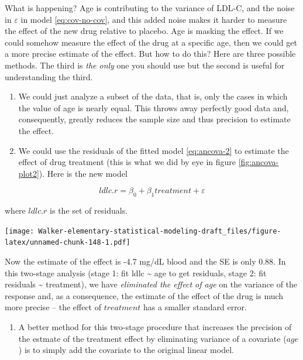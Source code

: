 \documentclass[]{book}
\providecommand{\tightlist}{%
  \setlength{\itemsep}{0pt}\setlength{\parskip}{0pt}}
\begin{document}
What is happening? Age is contributing to the variance of LDL-C, and the noise in \(\varepsilon\) in model \eqref{eq:cov-no-cov}, and this added noise makes it harder to measure the effect of the new drug relative to placebo. Age is masking the effect. If we could somehow measure the effect of the drug at a specific age, then we could get a more precise estimate of the effect. But how to do this? Here are three possible methods. The third is \emph{the only} one you should use but the second is useful for understanding the third.

\begin{enumerate}
\def\labelenumi{\arabic{enumi}.}
\item
  We could just analyze a subset of the data, that is, only the cases in which the value of age is nearly equal. This throws away perfectly good data and, consequently, greatly reduces the sample size and thus precision to estimate the effect.
\item
  We could use the residuals of the fitted model \eqref{eq:ancova-2} to estimate the effect of drug treatment (this is what we did by eye in figure \ref{fig:ancova-plot2}). Here is the new model
\end{enumerate}

\begin{equation}
ldlc.r = \beta_0 + \beta_1 treatment + \varepsilon
\label{eq:ancova-3}
\end{equation}

where \(ldlc.r\) is the set of residuals.

\texttt{[image: Walker-elementary-statistical-modeling-draft\_files/figure-latex/unnamed-chunk-148-1.pdf]}

Now the estimate of the effect is -4.7 mg/dL blood and the SE is only 0.88. In this two-stage analysis (stage 1: fit ldlc \textasciitilde{} age to get residuals, stage 2: fit residuals \textasciitilde{} treatment), we have \emph{eliminated the effect of age} on the variance of the response and, as a consequence, the estimate of the effect of the drug is much more precise -- the effect of \(treatment\) has a smaller standard error.

\begin{enumerate}
\def\labelenumi{\arabic{enumi}.}
\setcounter{enumi}{2}
\tightlist
\item
  A better method for this two-stage procedure that increases the precision of the estmate of the treatment effect by eliminating variance of a covariate (\(age\)) is to simply add the covariate to the original linear model.
\end{enumerate}
\end{document}

